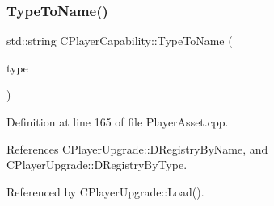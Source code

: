 \subsubsection{\texorpdfstring{Type\+To\+Name()}{TypeToName()}}
{\footnotesize\ttfamily std\+::string C\+Player\+Capability\+::\+Type\+To\+Name (\begin{DoxyParamCaption}\item[{\hyperlink{GameDataTypes_8h_a35b98ce26aca678b03c6f9f76e4778ce}{E\+Asset\+Capability\+Type}}]{type }\end{DoxyParamCaption})\hspace{0.3cm}{\ttfamily [static]}}



Definition at line 165 of file Player\+Asset.\+cpp.



References C\+Player\+Upgrade\+::\+D\+Registry\+By\+Name, and C\+Player\+Upgrade\+::\+D\+Registry\+By\+Type.



Referenced by C\+Player\+Upgrade\+::\+Load().


